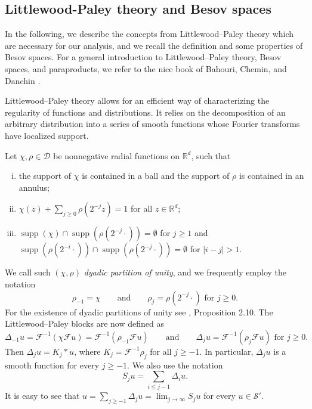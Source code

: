 \documentclass[11pt,a4paper]{article}
\newcommand{\cdummy}{\cdot}
\newcommand{\nocomma}{}
\newcommand{\tmop}[1]{\ensuremath{\operatorname{#1}}}
\newcommand{\tmtextit}[1]{{\itshape{#1}}}
\newenvironment{enumerateroman}{\begin{enumerate}[i.] }{\end{enumerate}}
\theoremstyle{remark}
\newcommand{\CD}{\ensuremath{\mathscr{D}}}
\newcommand{\CF}{\ensuremath{\mathscr{F}}}
\newcommand{\CS}{\ensuremath{\mathscr{S}}}
\begin{document}
\subsection{Littlewood-Paley theory and Besov spaces}\label{sec:littlewood}

In the following, we describe the concepts from Littlewood--Paley theory which are necessary for our analysis, and we recall the definition and some properties of Besov spaces. For a general introduction to Littlewood--Paley theory, Besov spaces, and paraproducts, we refer to the nice book of Bahouri, Chemin, and Danchin {\cite{Bahouri2011}}.

Littlewood--Paley theory allows for an efficient way of characterizing the regularity of functions and distributions. It relies on the decomposition of an arbitrary distribution into a series of smooth functions whose Fourier transforms have localized support.

Let $\chi \nocomma , \rho \in \CD$ be nonnegative radial functions on $\mathbb{R}^{d}$, such that
\begin{enumerateroman}
  \item the support of $\chi$ is contained in a ball and the support of $\rho$ is contained in an annulus;
  
  \item $\chi ( z ) + \sum_{j \geqslant 0} \rho ( 2^{-j} z ) =1$ for all $z \in \mathbb{R}^{d}$;
  
  \item \label{def:dyadic partition3}$\tmop{supp} ( \chi ) \cap \tmop{supp} (\rho ( 2^{-j} \cdummy ) ) = \emptyset$ for $j \geqslant 1$ and $\tmop{supp}( \rho ( 2^{-i} \cdummy ) ) \cap \tmop{supp} ( \rho ( 2^{-j} \cdummy ) ) =  \emptyset$ for $| i-j | >1$.
\end{enumerateroman}
We call such $( \chi , \rho )$ \tmtextit{dyadic partition of unity}, and we frequently employ the notation
\[
   \rho_{-1} = \chi \qquad \text{and} \qquad \rho_{j} = \rho (2^{-j} \cdummy ) \text{ for } j \geqslant 0.
\]
For the existence of dyadic partitions of unity see {\cite{Bahouri2011}}, Proposition 2.10. The Littlewood--Paley blocks are now defined as
\[
   \Delta_{-1} u= \CF^{-1} \left( \chi \CF u \right) = \CF^{-1} \left( \rho_{-1} \CF u \right) \qquad \text{and} \qquad \Delta_{j} u= \CF^{-1} \left( \rho_{j} \CF u \right) \text{ for }  j \geqslant 0. 
\]
Then $\Delta_{j} u=K_{j} \ast u$, where $K_{j} = \CF^{-1} \rho_{j}$ for all $j \geqslant -1$. In particular, $\Delta_{j} u$ is a smooth function for every $j \geqslant -1$. We also use the notation
\[
   S_{j} u= \sum_{i \leqslant j-1} \Delta_{i} u.
\]
It is easy to see that $u =  \sum_{j \geqslant -1} \Delta_{j} u= \lim_{j \rightarrow \infty} S_{j} u$ for every $u \in \CS'$.
\end{document}
